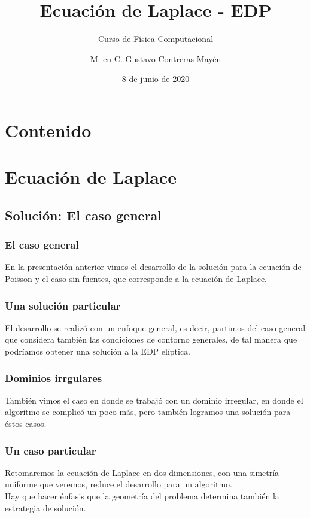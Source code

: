 


\normalfont
\usepackage{ccfonts}%
\usepackage[T1]{fontenc}%
\renewcommand{\rmdefault}{cmr}%
\newcommand{\funcionazul}[1]{\textcolor{blue}{\textbf{\texttt{#1}}}}
\linespread{1.3}
\title{Ecuación de Laplace - EDP}
\subtitle{Curso de Física Computacional}
\author{M. en C. Gustavo Contreras Mayén}
\date{8 de junio de 2020}
\newcommand{\seti}{\setcounter{saveenumi}{\value{enumi}}}
\newcommand{\conti}{\setcounter{enumi}{\value{saveenumi}}}

\maketitle
\fontsize{14}{14}\selectfont
{}
\section*{Contenido}
\section{Ecuación de Laplace}
\subsection{Solución: El caso general}
\begin{frame}
\frametitle{El caso general}
En la presentación anterior vimos el desarrollo de la solución para la ecuación de Poisson y el caso sin fuentes, que corresponde a la ecuación de Laplace.
\end{frame}
\begin{frame}
\frametitle{Una solución particular}
El desarrollo se realizó con un enfoque general, es decir, partimos del caso general que considera también las condiciones de contorno generales, de tal manera que podríamos obtener una solución a la EDP elíptica.
\end{frame}
\begin{frame}
\frametitle{Dominios irrgulares}
También vimos el caso en donde se trabajó con un dominio irregular, en donde el algoritmo se complicó un poco más, pero también logramos una solución para éstos casos.
\end{frame}
\begin{frame}
\frametitle{Un caso particular}
Retomaremos la ecuación de Laplace en dos dimensiones, con una simetría uniforme que veremos, reduce el desarrollo para un algoritmo.
\\
\bigskip
Hay que hacer énfasis que la geometría del problema determina también la estrategia de solución.
\end{frame}
